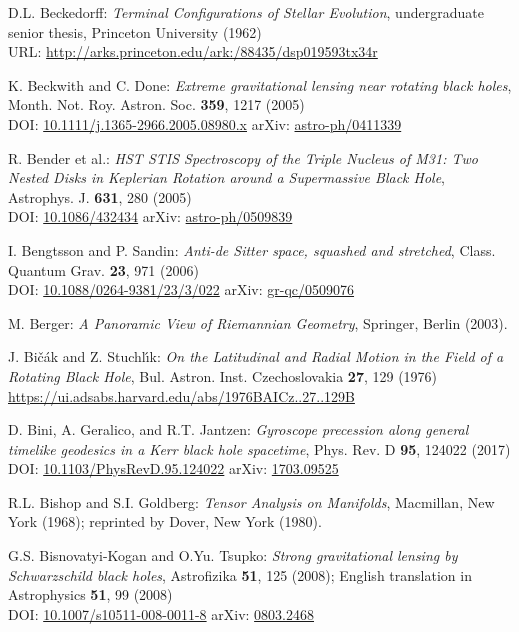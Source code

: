 \begin{thebibliography}{123}
D.L. Beckedorff:
{\em Terminal Configurations of Stellar Evolution},
undergraduate senior thesis, Princeton University (1962)\\
URL: \url{http://arks.princeton.edu/ark:/88435/dsp019593tx34r}

K. Beckwith and C. Done:
{\em Extreme gravitational lensing near rotating black holes},
Month. Not. Roy. Astron. Soc. {\bf 359}, 1217 (2005)\\
DOI: \href{https://doi.org/10.1111/j.1365-2966.2005.08980.x}{10.1111/j.1365-2966.2005.08980.x}\hfill
arXiv: \href{https://arxiv.org/abs/astro-ph/0411339}{astro-ph/0411339}

R. Bender et al.:
{\em HST STIS Spectroscopy of the Triple Nucleus of M31: Two Nested Disks in Keplerian Rotation around a Supermassive Black Hole},
Astrophys. J. {\bf 631}, 280 (2005)\\
DOI: \href{https://doi.org/10.1086/432434}{10.1086/432434}\hfill
arXiv: \href{https://arxiv.org/abs/astro-ph/0509839}{astro-ph/0509839}

I. Bengtsson and P. Sandin:
{\em Anti-de Sitter space, squashed and stretched},
Class. Quantum Grav. {\bf 23}, 971 (2006)\\
DOI: \href{https://doi.org/10.1088/0264-9381/23/3/022}{10.1088/0264-9381/23/3/022}\hfill
arXiv: \href{https://arxiv.org/abs/gr-qc/0509076}{gr-qc/0509076}

M. Berger: {\em A Panoramic View of Riemannian Geometry},
Springer, Berlin (2003).

J. Bi\v{c}\'{a}k and Z. Stuchl\'{\i}k:
{\em On the Latitudinal and Radial Motion in the Field of a Rotating Black Hole},
Bul. Astron. Inst. Czechoslovakia {\bf 27}, 129 (1976)\\
\url{https://ui.adsabs.harvard.edu/abs/1976BAICz..27..129B}

D. Bini, A. Geralico, and R.T. Jantzen:
{\em Gyroscope precession along general timelike geodesics in a Kerr black hole spacetime},
Phys. Rev. D {\bf 95}, 124022 (2017)\\
DOI: \href{https://doi.org/10.1103/PhysRevD.95.124022}{10.1103/PhysRevD.95.124022}\hfill
arXiv: \href{https://arxiv.org/abs/1703.09525}{1703.09525}

R.L. Bishop and S.I. Goldberg:
{\em Tensor Analysis on Manifolds},
Macmillan, New York (1968); reprinted by Dover, New York (1980).

G.S. Bisnovatyi-Kogan and O.Yu. Tsupko:
{\em Strong gravitational lensing by Schwarzschild black holes},
Astrofizika {\bf 51}, 125 (2008); English translation in
Astrophysics {\bf 51}, 99 (2008)\\
DOI: \href{https://doi.org/10.1007/s10511-008-0011-8}{10.1007/s10511-008-0011-8}\hfill
arXiv: \href{https://arxiv.org/abs/0803.2468}{0803.2468}


\end{thebibliography}

